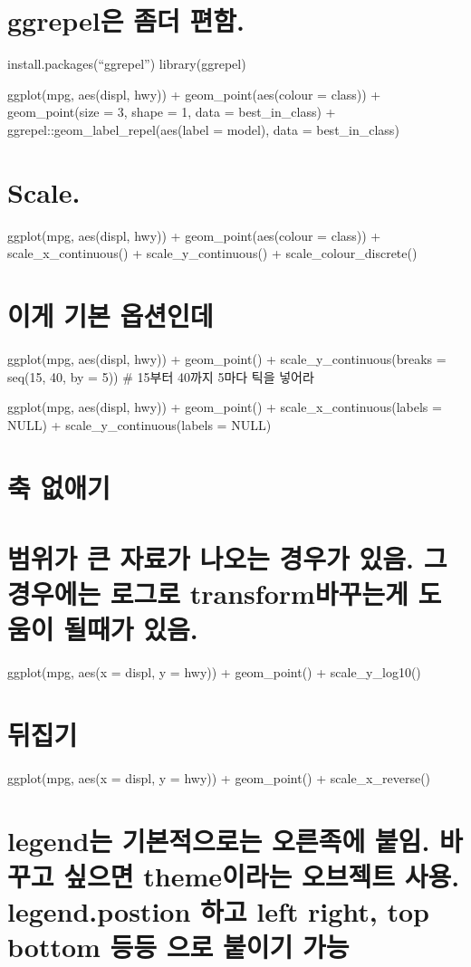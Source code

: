 \documentclass[]{article}
\begin{document}
\section{ggrepel은 좀더 편함.}\label{ggrepel--.}

install.packages(``ggrepel'') library(ggrepel)

ggplot(mpg, aes(displ, hwy)) + geom\_point(aes(colour = class)) +
geom\_point(size = 3, shape = 1, data = best\_in\_class) +
ggrepel::geom\_label\_repel(aes(label = model), data = best\_in\_class)

\section{Scale.}\label{scale.}

ggplot(mpg, aes(displ, hwy)) + geom\_point(aes(colour = class)) +
scale\_x\_continuous() + scale\_y\_continuous() +
scale\_colour\_discrete()

\section{이게 기본 옵션인데}\label{--}

ggplot(mpg, aes(displ, hwy)) + geom\_point() +
scale\_y\_continuous(breaks = seq(15, 40, by = 5)) \# 15부터 40까지
5마다 틱을 넣어라

ggplot(mpg, aes(displ, hwy)) + geom\_point() +
scale\_x\_continuous(labels = NULL) + scale\_y\_continuous(labels =
NULL)

\section{축 없애기}\label{-}

\section{범위가 큰 자료가 나오는 경우가 있음. 그경우에는 로그로
transform바꾸는게 도움이 될때가 있음.}\label{-----.---transform---.}

ggplot(mpg, aes(x = displ, y = hwy)) + geom\_point() + scale\_y\_log10()

\section{뒤집기}

ggplot(mpg, aes(x = displ, y = hwy)) + geom\_point() +
scale\_x\_reverse()

\section{legend는 기본적으로는 오른족에 붙임. 바꾸고 싶으면 theme이라는
오브젝트 사용. legend.postion 하고 left right, top bottom 등등 으로
붙이기
가능}\label{legend---.---theme--.-legend.postion--left-right-top-bottom----}
\end{document}
